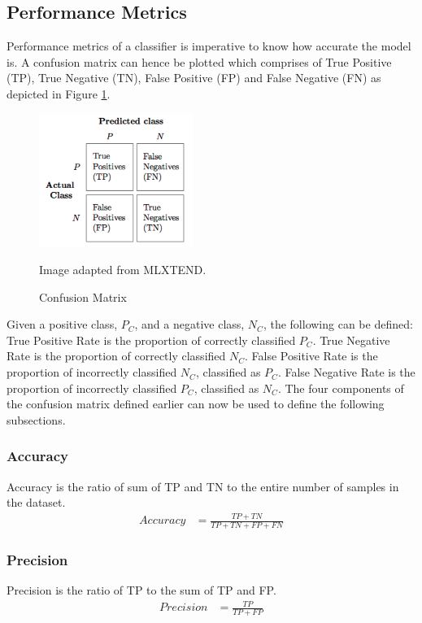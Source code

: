 \documentclass[a4paper,12pt,twoside]{report}
\begin{document}
\subsection{Performance Metrics}
Performance metrics of a classifier is imperative to know how accurate the model is. A confusion matrix can hence be plotted which comprises of True Positive (TP), True Negative (TN), False Positive (FP) and False Negative (FN) as depicted in Figure \ref{fig:confusion-matrix}.
\begin{figure}[h] %
    \centering
    \includegraphics[width=5cm]{confusion_matrix}
    \caption{Confusion Matrix}
    \small Image adapted from MLXTEND\footnotemark.
    \label{fig:confusion-matrix}
\end{figure}
\newline \newline
Given a positive class, $P_C$, and a negative class, $N_C$, the following can be defined:
\newline \newline
True Positive Rate is the proportion of correctly classified $P_C$. True Negative Rate is the proportion of correctly classified $N_C$. False Positive Rate is the proportion of incorrectly classified $N_C$, classified as $P_C$. False Negative Rate is the proportion of incorrectly classified $P_C$, classified as $N_C$. The four components of the confusion matrix defined earlier can now be used to define the following subsections.

\subsubsection{Accuracy} 
Accuracy is the ratio of sum of TP and TN to the entire number of samples in the dataset.
\begin{align*}
Accuracy &= \frac{ TP + TN}{TP + TN + FP + FN}
\end{align*}

\subsubsection{Precision} 
Precision is the ratio of TP to the sum of TP and FP.
\begin{align*}
Precision &= \frac{TP}{TP + FP}
\end{align*}
\end{document}
